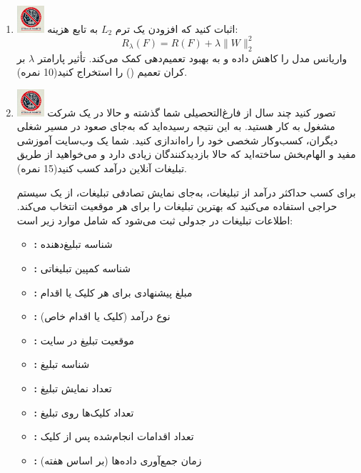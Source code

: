 \documentclass[12pt]{article}
\begin{document}
\begin{enumerate}
    \item \includegraphics[width=1cm]{figs/Forbidden_AI.jpg}
   اثبات کنید که افزودن یک ترم \( L_2 \) به تابع هزینه:
    \[
    R_\lambda (F) = R(F) + \lambda \| W \|_2^2
    \]
    واریانس مدل را کاهش داده و به بهبود تعمیم‌دهی کمک می‌کند. تأثیر پارامتر \( \lambda \) بر کران تعمیم () را استخراج کنید(10 نمره).


    \item \includegraphics[width=1cm]{figs/Forbidden_AI.jpg}
    تصور کنید چند سال از فارغ‌التحصیلی شما گذشته و حالا در یک شرکت مشغول به کار هستید. به این نتیجه رسیده‌اید که به‌جای صعود در مسیر شغلی دیگران، کسب‌وکار شخصی خود را راه‌اندازی کنید. شما یک وب‌سایت آموزشی مفید و الهام‌بخش ساخته‌اید که حالا بازدیدکنندگان زیادی دارد و می‌خواهید از طریق تبلیغات آنلاین درآمد کسب کنید(15 نمره).

    برای کسب حداکثر درآمد از تبلیغات، به‌جای نمایش تصادفی تبلیغات، از یک سیستم حراجی استفاده می‌کنید که بهترین تبلیغات را برای هر موقعیت انتخاب می‌کند. اطلاعات تبلیغات در جدولی ثبت می‌شود که شامل موارد زیر است:
    
    \begin{itemize}
        \item \textbf{:} شناسه تبلیغ‌دهنده
        \item \textbf{:} شناسه کمپین تبلیغاتی
        \item \textbf{:} مبلغ پیشنهادی برای هر کلیک یا اقدام
        \item \textbf{:} نوع درآمد (کلیک یا اقدام خاص)
        \item \textbf{:} موقعیت تبلیغ در سایت
        \item \textbf{:} شناسه تبلیغ
        \item \textbf{:} تعداد نمایش تبلیغ
        \item \textbf{:} تعداد کلیک‌ها روی تبلیغ
        \item \textbf{:} تعداد اقدامات انجام‌شده پس از کلیک
        \item \textbf{:} زمان جمع‌آوری داده‌ها (بر اساس هفته)
    \end{itemize}
    

\end{enumerate}
\end{document}
